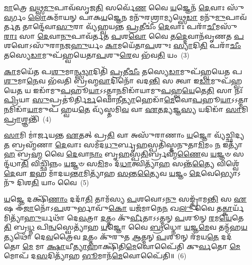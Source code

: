 \-\ul{𑌮𑌾}\-𑌤𑍍𑌰𑍇 \ul{𑌵}\-𑌥𑍍𑌸\-\ul{𑌮𑍁}\-𑌪𑌾𑌵᳴𑌸𑍃𑌜\-\ul{𑌤𑌿} 𑌸𑌰𑍍𑌵𑍇᳴\-\ul{𑌣} 𑌵𑍈 \ul{𑌯}\-𑌜𑍍𑌞𑍇𑌨᳴ \ul{𑌦𑍇}\-𑌵𑌾𑌃 𑌸𑍁᳴\-\ul{𑌵}\-𑌰𑍍𑌗𑌂 \ul{𑌲𑍋}\-𑌕𑌮𑌾᳴𑌯𑌨𑍍 𑌪𑌾𑌕\-\ul{𑌯}\-𑌜𑍍𑌞𑍇\-\ul{𑌨} 𑌮𑌨𑍁᳴𑌰𑌶𑍍𑌰𑌾\-\ul{𑌮𑍍𑌯}\-𑌥𑍍𑌸𑍇\-\ul{𑌡𑌾} 𑌮𑌨𑍁᳴\-\ul{𑌮𑍁}\-𑌪𑌾𑌵᳴𑌰𑍍𑌤\-\ul{𑌤} 𑌤𑌾𑌨𑍍𑌦𑍇᳴𑌵𑌾\-\ul{𑌸𑍁}\-𑌰𑌾 𑌵𑍍𑌯᳴𑌹𑍍𑌵𑌯𑌨𑍍𑌤 \ul{𑌪𑍍𑌰}\-𑌤𑍀𑌚𑍀𑌂॑ \ul{𑌦𑍇}\-𑌵𑌾𑌃 𑌪𑌰𑌾᳴\-\ul{𑌚𑍀}\-𑌮𑌸𑍁᳴\-\ul{𑌰𑌾𑌃} 𑌸𑌾 \ul{𑌦𑍇}\-𑌵𑌾\-\ul{𑌨𑍁}\-𑌪𑌾𑌵᳴𑌰𑍍𑌤𑌤 \ul{𑌪}\-𑌶\-\ul{𑌵𑍋} 𑌵𑍈 𑌤\-\ul{𑌦𑍍𑌦𑍇}\-𑌵𑌾𑌨᳴𑌵𑍃𑌣𑌤 \ul{𑌪}\-𑌶𑌵𑍋\-𑌽𑌸𑍁᳴𑌰𑌾𑌨𑌜\-\ul{𑌹𑍁}\-𑌰𑍍𑌯𑌂 \ul{𑌕𑌾}\-𑌮𑌯𑍇᳴𑌤𑌾\-\ul{𑌪}\-𑌶𑍁𑌃 \ul{𑌸𑍍𑌯𑌾}\-𑌦𑌿\-\ul{𑌤𑌿} 𑌪𑌰𑌾᳴\-\ul{𑌚𑍀𑌂} 𑌤𑌸𑍍𑌯𑍇\-\ul{𑌡𑌾}\-𑌮𑍁𑌪᳴𑌹𑍍𑌵𑌯𑍇𑌤𑌾\-\ul{𑌪}\-𑌶𑍁\-\ul{𑌰𑍇}\-𑌵 𑌭᳴𑌵\-\ul{𑌤𑌿} 𑌯𑌂~(3)

\-\ul{𑌕𑌾}\-𑌮𑌯𑍇᳴𑌤 𑌪\-\ul{𑌶𑍁}\-𑌮𑌾\-\ul{𑌨𑍍𑌥𑍍𑌸𑍍𑌯𑌾}\-𑌦𑌿𑌤𑌿᳴ \ul{𑌪𑍍𑌰}\-𑌤𑍀\-\ul{𑌚𑍀𑌂} 𑌤𑌸𑍍𑌯𑍇\-\ul{𑌡𑌾}\-𑌮𑍁𑌪᳴𑌹𑍍𑌵𑌯𑍇𑌤 𑌪\-\ul{𑌶𑍁}\-𑌮𑌾\-\ul{𑌨𑍇}\-𑌵 𑌭᳴𑌵𑌤𑌿 𑌬𑍍𑌰𑌹𑍍𑌮\-\ul{𑌵𑌾}\-𑌦𑌿𑌨𑍋᳴ 𑌵𑌦\-\ul{𑌨𑍍𑌤𑌿} 𑌸 𑌤𑍍𑌵𑌾 𑌇\-\ul{𑌡𑌾}\-𑌮𑍁𑌪᳴𑌹𑍍𑌵𑌯𑍇\-\ul{𑌤} 𑌯 𑌇𑌡𑌾᳴𑌮𑍁\-\ul{𑌪}\-𑌹𑍂\-\ul{𑌯𑌾}\-\-𑌽\-𑌽𑌤𑍍𑌮𑌾\-\ul{𑌨}\-𑌮𑌿𑌡𑌾᳴𑌯𑌾𑌮𑍁\-\ul{𑌪}\-𑌹𑍍𑌵\-\ul{𑌯𑍇}\-𑌤𑍇\-\ul{𑌤𑌿} 𑌸𑌾 𑌨𑌃᳴ \ul{𑌪𑍍𑌰𑌿}\-𑌯𑌾 \ul{𑌸𑍁}\-𑌪𑍍𑌰𑌤𑍂॑𑌰𑍍𑌤𑌿\-\ul{𑌰𑍍𑌮}\-𑌘𑍋𑌨𑍀\-\ul{𑌤𑍍𑌯𑌾}\-𑌹𑍇𑌡𑌾᳴\-\ul{𑌮𑍇}\-𑌵𑍋\-\ul{𑌪}\-𑌹𑍂\-\ul{𑌯𑌾}\-\-𑌽\-𑌽𑌤𑍍𑌮𑌾\-\ul{𑌨}\-𑌮𑌿𑌡𑌾᳴\-\ul{𑌯𑌾}\-𑌮𑍁𑌪᳴ 𑌹𑍍𑌵𑌯\-\ul{𑌤𑍇} 𑌵𑍍𑌯᳴𑌸𑍍𑌤𑌮𑌿\-\ul{𑌵} 𑌵𑌾 \ul{𑌏}\-𑌤\-\ul{𑌦𑍍𑌯}\-𑌜𑍍𑌞\-\ul{𑌸𑍍𑌯} 𑌯𑌦𑌿𑌡𑌾᳴ \ul{𑌸𑌾}\-𑌮𑌿 \ul{𑌪𑍍𑌰𑌾}\-𑌶𑍍𑌞𑌨𑍍𑌤𑌿᳴~(4)

\-\ul{𑌸𑌾}\-𑌮𑌿 𑌮𑌾॑𑌰𑍍𑌜𑌯𑌨𑍍𑌤 \ul{𑌏}\-𑌤𑌤𑍍 𑌪𑍍𑌰\-\ul{𑌤𑌿} 𑌵𑌾 𑌅𑌸𑍁᳴𑌰𑌾𑌣𑌾𑌂 \ul{𑌯}\-𑌜𑍍𑌞𑍋 𑌵𑍍𑌯᳴𑌚𑍍𑌛𑌿𑌦𑍍𑌯\-\ul{𑌤} 𑌬𑍍𑌰𑌹𑍍𑌮᳴𑌣𑌾 \ul{𑌦𑍇}\-𑌵𑌾𑌃 𑌸𑌮᳴𑌦\-\ul{𑌧𑍁}\-𑌰𑍍𑌬𑍃\-\ul{𑌹}\-𑌸𑍍𑌪𑌤𑌿᳴𑌸𑍍𑌤𑌨𑍁𑌤𑌾\-\ul{𑌮𑌿}\-𑌮𑌂 \ul{𑌨} 𑌇𑌤𑍍𑌯𑌾᳴\-\ul{𑌹} 𑌬𑍍𑌰\-\ul{𑌹𑍍𑌮} 𑌵𑍈 \ul{𑌦𑍇}\-𑌵𑌾\-\ul{𑌨𑌾𑌂} 𑌬𑍃\-\ul{𑌹}\-𑌸𑍍𑌪\-\ul{𑌤𑌿}\-𑌰𑍍𑌬𑍍𑌰𑌹𑍍𑌮᳴\-\ul{𑌣𑍈}\-𑌵 \ul{𑌯}\-𑌜𑍍𑌞𑍞 𑌸𑌨𑍍𑌦᳴𑌧𑌾\-\ul{𑌤𑌿} 𑌵𑌿𑌚𑍍𑌛𑌿᳴𑌨𑍍𑌨𑌂 \ul{𑌯}\-𑌜𑍍𑌞𑍞 𑌸\-\ul{𑌮𑌿}\-𑌮𑌂 𑌦᳴\-\ul{𑌧𑌾}\-𑌤𑍍𑌵𑌿𑌤𑍍𑌯𑌾᳴\-\ul{𑌹} 𑌸𑌨𑍍𑌤᳴\-\ul{𑌤𑍍𑌯𑍈} 𑌵𑌿𑌶𑍍𑌵𑍇᳴ \ul{𑌦𑍇}\-𑌵𑌾 \ul{𑌇}\-𑌹 𑌮𑌾᳴𑌦𑌯\-\ul{𑌨𑍍𑌤𑌾}\-𑌮𑌿𑌤𑍍𑌯𑌾᳴𑌹 \ul{𑌸}\-𑌨𑍍𑌤\-\ul{𑌤𑍍𑌯𑍈}\-𑌵 \ul{𑌯}\-𑌜𑍍𑌞𑌂 \ul{𑌦𑍇}\-𑌵𑍇𑌭𑍍𑌯𑍋\-𑌽𑌨𑍁᳴ 𑌦𑌿𑌶\-\ul{𑌤𑌿} 𑌯𑌾𑌂 𑌵𑍈~(5)


\-\ul{𑌯}\-𑌜𑍍𑌞𑍇 𑌦𑌕𑍍𑌷𑌿᳴\-\ul{𑌣𑌾𑌂} 𑌦𑌦𑌾᳴\-\ul{𑌤𑌿} 𑌤𑌾𑌮᳴𑌸𑍍𑌯 \ul{𑌪}\-𑌶𑌵𑍋\-𑌽\-\ul{𑌨𑍁} 𑌸𑌙𑍍𑌕𑍍𑌰𑌾᳴𑌮\-\ul{𑌨𑍍𑌤𑌿} 𑌸 \ul{𑌏}\-𑌷 𑌈᳴\-\ul{𑌜𑌾}\-𑌨𑍋᳴\-𑌽\-\ul{𑌪}\-𑌶𑍁𑌰𑍍𑌭𑌾𑌵𑍁᳴\-\ul{𑌕𑍋} 𑌯𑌜᳴𑌮𑌾𑌨𑍇\-\ul{𑌨} 𑌖\-\ul{𑌲𑍁} 𑌵𑍈 𑌤\-\ul{𑌤𑍍𑌕𑌾}\-𑌰𑍍𑌯᳴𑌮𑌿𑌤𑍍𑌯𑌾᳴\-\ul{𑌹𑍁}\-𑌰𑍍𑌯𑌥𑌾᳴ 𑌦𑍇\-\ul{𑌵}\-𑌤𑍍𑌰𑌾 \ul{𑌦}\-𑌤𑍍𑌤𑌂 𑌕𑍁᳴\-\ul{𑌰𑍍𑌵𑍀}\-𑌤𑌾𑌽𑌽𑌤𑍍𑌮𑌨𑍍 \ul{𑌪}\-𑌶𑍂𑌨𑍍 \ul{𑌰}\-𑌮\-\ul{𑌯𑍇}\-𑌤𑍇\-\ul{𑌤𑌿} 𑌬𑍍𑌰\-\ul{𑌧𑍍𑌨} 𑌪𑌿\-\ul{𑌨𑍍𑌵}\-𑌸𑍍𑌵𑍇𑌤𑍍𑌯𑌾᳴𑌹 \ul{𑌯}\-𑌜𑍍𑌞𑍋 𑌵𑍈 \ul{𑌬𑍍𑌰}\-𑌧𑍍𑌨𑍋 \ul{𑌯}\-𑌜𑍍𑌞\-\ul{𑌮𑍇}\-𑌵 𑌤𑌨𑍍𑌮᳴𑌹\-\ul{𑌯}\-𑌤𑍍𑌯𑌥𑍋᳴ 𑌦𑍇\-\ul{𑌵}\-𑌤𑍍𑌰𑍈𑌵 \ul{𑌦}\-𑌤𑍍𑌤𑌂 𑌕𑍁᳴𑌰𑍁𑌤 \ul{𑌆}\-𑌤𑍍𑌮𑌨𑍍 \ul{𑌪}\-𑌶𑍂𑌨𑍍 𑌰᳴𑌮𑌯\-\ul{𑌤𑍇} 𑌦𑌦᳴𑌤𑍋 \ul{𑌮𑍇} 𑌮𑌾 \ul{𑌕𑍍𑌷𑌾}\-𑌯𑍀\-\ul{𑌤𑍍𑌯𑌾}\-𑌹𑌾𑌕𑍍𑌷𑌿᳴𑌤𑌿\-\ul{𑌮𑍇}\-𑌵𑍋𑌪𑍈᳴𑌤𑌿 𑌕𑍁\-\ul{𑌰𑍍𑌵}\-𑌤𑍋 \ul{𑌮𑍇} 𑌮𑍋𑌪᳴ 𑌦\-\ul{𑌸}\-𑌦𑌿𑌤𑍍𑌯𑌾᳴𑌹 \ul{𑌭𑍂}\-𑌮𑌾𑌨᳴\-\ul{𑌮𑍇}\-𑌵𑍋𑌪𑍈᳴𑌤𑌿॥~(6)

{\anuvakamend[{\-\ul{𑌵𑌿}\-𑌦𑍍𑌵𑌾𑌨𑍍𑌧𑍍𑌯𑌾᳴\-\ul{𑌯𑍇} 𑌦𑍍𑌯𑌂 \ul{𑌪𑍍𑌰𑌾}\-𑌶𑍍𑌞\-\ul{𑌨𑍍𑌤𑌿} 𑌯𑌾𑌂 𑌵𑍈 \ul{𑌮} 𑌏\-\ul{𑌕𑌾}\-𑌨𑍍𑌨𑌵𑌿𑍞᳴\-\ul{𑌶}\-𑌤𑌿𑌶𑍍𑌚᳴}]}%

